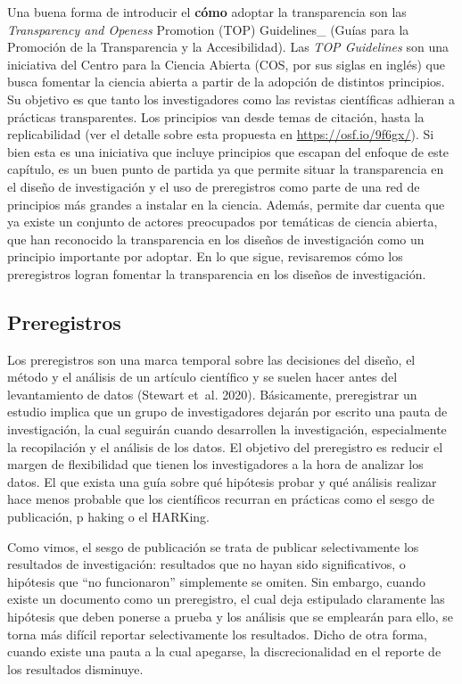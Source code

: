 \documentclass[
  spanish,
  letterpaper,
  DIV=11,
  numbers=noendperiod]{scrreprt}
\begin{document}
Una buena forma de introducir el \textbf{cómo} adoptar la transparencia
son las \emph{Transparency and Openess} Promotion (TOP) Guidelines\_
(Guías para la Promoción de la Transparencia y la Accesibilidad). Las
\emph{TOP Guidelines} son una iniciativa del Centro para la Ciencia
Abierta (COS, por sus siglas en inglés) que busca fomentar la ciencia
abierta a partir de la adopción de distintos principios. Su objetivo es
que tanto los investigadores como las revistas científicas adhieran a
prácticas transparentes. Los principios van desde temas de citación,
hasta la replicabilidad (ver el detalle sobre esta propuesta en
\url{https://osf.io/9f6gx/}). Si bien esta es una iniciativa que incluye
principios que escapan del enfoque de este capítulo, es un buen punto de
partida ya que permite situar la transparencia en el diseño de
investigación y el uso de preregistros como parte de una red de
principios más grandes a instalar en la ciencia. Además, permite dar
cuenta que ya existe un conjunto de actores preocupados por temáticas de
ciencia abierta, que han reconocido la transparencia en los diseños de
investigación como un principio importante por adoptar. En lo que sigue,
revisaremos cómo los preregistros logran fomentar la transparencia en
los diseños de investigación.

\subsection{Preregistros}\label{preregistros}

Los preregistros son una marca temporal sobre las decisiones del diseño,
el método y el análisis de un artículo científico y se suelen hacer
antes del levantamiento de datos (Stewart et~al. 2020). Básicamente,
preregistrar un estudio implica que un grupo de investigadores dejarán
por escrito una pauta de investigación, la cual seguirán cuando
desarrollen la investigación, especialmente la recopilación y el
análisis de los datos. El objetivo del preregistro es reducir el margen
de flexibilidad que tienen los investigadores a la hora de analizar los
datos. El que exista una guía sobre qué hipótesis probar y qué análisis
realizar hace menos probable que los científicos recurran en prácticas
como el sesgo de publicación, p haking o el HARKing.

Como vimos, el sesgo de publicación se trata de publicar selectivamente
los resultados de investigación: resultados que no hayan sido
significativos, o hipótesis que ``no funcionaron'' simplemente se
omiten. Sin embargo, cuando existe un documento como un preregistro, el
cual deja estipulado claramente las hipótesis que deben ponerse a prueba
y los análisis que se emplearán para ello, se torna más difícil reportar
selectivamente los resultados. Dicho de otra forma, cuando existe una
pauta a la cual apegarse, la discrecionalidad en el reporte de los
resultados disminuye.
\end{document}
